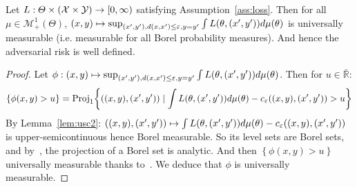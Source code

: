 \begin{lemma}
\label{lem:measure-sup}
Let $L:\Theta\times(\mathcal{X}\times\mathcal{Y})\rightarrow [0,\infty)$ satisfying Assumption~\ref{ass:loss}.
Then for all $\mu\in\mathcal{M}^1_+(\Theta)$, $(x,y)\mapsto \sup_{(x',y'),d(x,x')\leq\varepsilon,y=y'} \int L(\theta,(x',y'))d\mu(\theta)$ is universally measurable (i.e. measurable for all Borel probability measures). And hence the adversarial risk is well defined. 
\end{lemma}
\begin{proof}
Let $\phi :(x,y)\mapsto \sup_{(x',y'),d(x,x')\leq\varepsilon,y=y'} \int L(\theta,(x',y'))d\mu(\theta)$. Then for $u\in\bar{\mathbb{R}}$:
\begin{align*}
\left\{\phi(x,y)>u\right\}=\text{Proj}_1\left\{((x,y),(x',y'))\mid\int \loss(\theta,(x',y'))d\mu(\theta)-c_\varepsilon((x,y),(x',y'))>u\right\}
\end{align*}
By Lemma~\ref{lem:usc2}: $((x,y),(x',y'))\mapsto \int L(\theta,(x',y'))d\mu(\theta)-c_\varepsilon((x,y),(x',y'))$ is upper-semicontinuous hence Borel measurable. So its level sets are Borel sets, and by~\citep[Proposition 7.39]{bertsekas2004stochastic}, the projection of a Borel set is analytic. And then $\left\{\phi(x,y)>u\right\}$ universally measurable thanks to~\citep[Corollary 7.42.1]{bertsekas2004stochastic}. We deduce that $\phi$ is universally measurable.
\end{proof}



